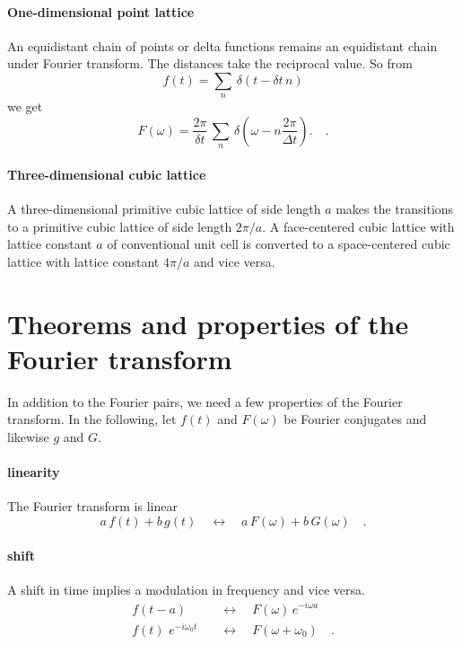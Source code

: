 \paragraph{One-dimensional point lattice} An equidistant chain of points or delta functions remains an equidistant chain under Fourier transform. The distances take  the reciprocal value. So from
\begin{equation}
 f(t) = \sum_n \, \delta (t - \delta t \, n)
\end{equation}
we get
\begin{equation}
 F(\omega) = \frac{2 \pi}{\delta t} \, \sum_n \, \delta \left(\omega - n\frac{2 \pi}{\Delta t} \right). \quad .
\end{equation}


\paragraph{Three-dimensional cubic lattice} A three-dimensional primitive cubic lattice of side length $a$ makes the transitions to a primitive cubic lattice of side length $2 \pi/a$. A face-centered cubic lattice with lattice constant $a$ of conventional unit cell is converted  to a space-centered cubic lattice with lattice constant $4 \pi / a$ and vice versa. 


\section{Theorems and properties of the Fourier transform}

In addition to the Fourier pairs, we need a few properties of the Fourier transform. In the following, let $f(t)$ and $F(\omega)$ be Fourier conjugates and likewise $g$ and $G$.

\paragraph{linearity} The Fourier transform is linear
\begin{equation}
a \, f(t) + b \, g(t) \quad \leftrightarrow \quad 
a \, F(\omega) + b \, G(\omega)  \quad .
\end{equation}

\paragraph{shift} A shift in time implies a modulation in frequency and vice versa.
\begin{align}
 f(t - a) & \quad \leftrightarrow \quad 
F(\omega) \, e^{-i \omega a} \\
 f(t) \, \, e^{-i \omega_0 t} & \quad \leftrightarrow \quad 
F(\omega + \omega_0)   \quad .
\end{align}

